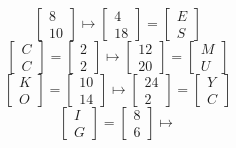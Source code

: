 \documentclass[letterpaper,11pt]{article}
\begin{document}
\begin{enumerate}
\begin{enumerate}
\begin{equation*}
            \begin{bmatrix} 8 \\ 10 \end{bmatrix} \mapsto
            \begin{bmatrix} 4 \\ 18 \end{bmatrix} =
            \begin{bmatrix} E \\ S \end{bmatrix}
        \end{equation*}
        \begin{equation*}
            \begin{bmatrix} C \\ C \end{bmatrix} =
            \begin{bmatrix} 2 \\ 2 \end{bmatrix} \mapsto
            \begin{bmatrix} 12 \\ 20 \end{bmatrix} =
            \begin{bmatrix} M \\ U \end{bmatrix}
        \end{equation*}
        \begin{equation*}
            \begin{bmatrix} K \\ O \end{bmatrix} =
            \begin{bmatrix} 10 \\ 14 \end{bmatrix} \mapsto
            \begin{bmatrix} 24 \\ 2 \end{bmatrix} =
            \begin{bmatrix} Y \\ C \end{bmatrix}
        \end{equation*}
        \begin{equation*}
            \begin{bmatrix} I \\ G \end{bmatrix} =
            \begin{bmatrix} 8 \\ 6 \end{bmatrix} \mapsto

\end{equation*}
\end{enumerate}
\end{enumerate}
\end{document}
